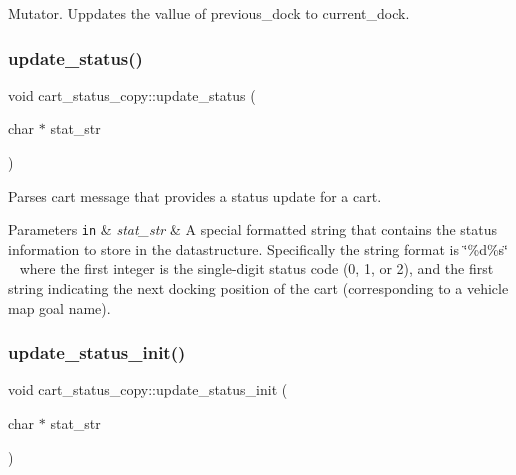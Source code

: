 Mutator. Uppdates the vallue of previous\+\_\+dock to current\+\_\+dock. \mbox{\label{classcart__status__copy_ace79b133b98000c72617917b1f434df8}} 
\subsubsection{\texorpdfstring{update\+\_\+status()}{update\_status()}}
{\footnotesize\ttfamily void cart\+\_\+status\+\_\+copy\+::update\+\_\+status (\begin{DoxyParamCaption}\item[{char $\ast$}]{stat\+\_\+str }\end{DoxyParamCaption})}

Parses cart message that provides a status update for a cart. 
\begin{DoxyParams}[1]{Parameters}
\mbox{\tt in}  & {\em stat\+\_\+str} & A special formatted string that contains the status information to store in the datastructure. Specifically the string format is \char`\"{}\%d\%s\char`\"{} ~\newline
 where the first integer is the single-\/digit status code (0, 1, or 2), and the first string indicating the next docking position of the cart (corresponding to a vehicle map goal name). \\
\hline
\end{DoxyParams}
\mbox{\label{classcart__status__copy_ac0af1c110916a2fdd7ab7198bdca183a}} 
\subsubsection{\texorpdfstring{update\+\_\+status\+\_\+init()}{update\_status\_init()}}
{\footnotesize\ttfamily void cart\+\_\+status\+\_\+copy\+::update\+\_\+status\+\_\+init (\begin{DoxyParamCaption}\item[{char $\ast$}]{stat\+\_\+str }\end{DoxyParamCaption})}

